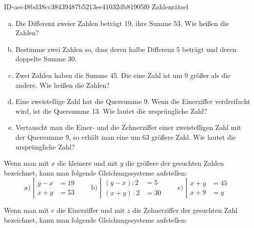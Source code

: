 \begin{exercise}
      {ID-aec48bd38cc38439487b5213ee41032db81905f0}
      {Zahlenrätsel}
  \ifproblem\problem\par
    \begin{enumerate}[a)]
      \item Die Differenz zweier Zahlen beträgt \num{19}, ihre Summe \num{53}. Wie heißen
            die Zahlen?
      \item Bestimme zwei Zahlen so, dass deren halbe Differenz \num{5} beträgt und deren
            doppelte Summe \num{30}.
      \item Zwei Zahlen haben die Summe \num{45}. Die eine Zahl ist um \num{9} größer als die andere.
            Wie heißen die Zahlen?
      \item Eine zweistellige Zahl hat die Quersumme \num{9}. Wenn die Einerziffer verdreifacht
            wird, ist die Quersumme \num{13}. Wie lautet die ursprüngliche Zahl?
      \item Vertauscht man die Einer- und die Zehnerziffer einer zweistelligen Zahl mit
            der Quersumme \num{9}, so erhält man eine um \num{63} größere Zahl. Wie lautet die
            ursprüngliche Zahl?
    \end{enumerate}
  \fi
  \ifoutline\outline\par
    Wenn man mit $x$ die kleinere und mit $y$ die größere der gesuchten Zahlen
    bezeichnet, kann man folgende Gleichungssysteme aufstellen:
    \begin{equation*}
      \text{a)~}
      \left|
      \begin{split}
        y-x&=\num{19}\\
        x+y&=\num{53}
      \end{split}
      \right.
      \qquad
      \text{b)~}
      \left|
      \begin{split}
        (y-x):2&=\num{5}\\
        (x+y)\cdot2&=\num{30}
      \end{split}
      \right.
      \qquad
      \text{c)~}
      \left|
      \begin{split}
        x+y&=\num{45}\\
        x+\num{9}&=y
      \end{split}
      \right.
    \end{equation*}\par
    Wenn man mit $e$ die Einerziffer und mit $z$ die Zehnerziffer der
    gesuchten Zahl bezeichnet, kann man folgende Gleichungssysteme aufstellen:

\end{exercise}
